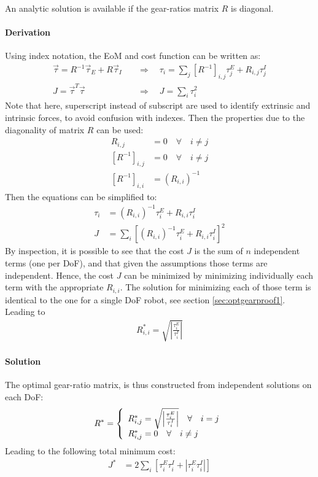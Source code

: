 An analytic solution is available if the gear-ratios matrix $R$ is diagonal.

\paragraph{Derivation}

Using index notation, the EoM and cost function can be written as:
%
\begin{align}
\vec{ \tau } =  R^{-1} \vec{\tau}_E + R \vec{\tau}_I \quad &\Rightarrow \quad \tau_i = \sum_j{ \left[ R^{-1}\right]_{i,j} \tau_j^E + R_{i,j} \tau_j^I }\\
J =  \vec{ \tau }^T \vec{ \tau } \quad &\Rightarrow \quad J = \sum_i{ \tau_i^2 }
\end{align}
%
Note that here, superscript instead of subscript are used to identify extrinsic and intrinsic forces, to avoid confusion with indexes. Then the properties due to the diagonality of matrix $R$ can be used:
%
\begin{align}
R_{i,j}                    &= 0 \quad \forall \quad i \neq j \\
\left[ R^{-1}\right]_{i,j} &= 0 \quad \forall \quad i \neq j \\
\left[ R^{-1}\right]_{i,i} &= \left( R_{i,i}  \right)^{-1}
\end{align}
%
Then the equations can be simplified to:
%
\begin{align}
\tau_i &= \left( R_{i,i}  \right)^{-1} \tau_i^E + R_{i,i} \tau_i^I \\
J      &= \sum_i{ \left[  \left( R_{i,i}  \right)^{-1} \tau_i^E + R_{i,i} \tau_i^I   \right]^2 }
\end{align}
%
By inspection, it is possible to see that the cost $J$ is the sum of $n$ independent terms (one per DoF), and that given the assumptions those terms are independent. Hence, the cost $J$ can be minimized by minimizing individually each term with the appropriate $R_{i,i}$. The solution for minimizing each of those term is identical to the one for a single DoF robot, see section \ref{sec:optgearproof1}. Leading to 
%
\begin{align}
R_{i,i}^* = \sqrt{\left| \frac{\tau_i^E}{\tau_i^I}\right|}
\end{align}
%

\paragraph{Solution}
The optimal gear-ratio matrix, is thus constructed from independent solutions on each DoF:
%
\begin{align}
R^* = \left \{
\begin{array}[pos]{l}
	R^*_{i,j} = \sqrt{\left| \frac{\tau_i^E}{\tau_i^I}\right|} \quad \forall \quad i = j \\
	R^*_{i,j} = 0                                              \quad \forall \quad i \neq j
\end{array} \right.
\end{align}
%
Leading to the following total minimum cost:
%
\begin{align}
J^*   &= 2 \sum_i{ \left[ \tau_i^E \tau_i^I + \left| \tau_i^E \tau_i^I \right| \right] }
\end{align}
%

